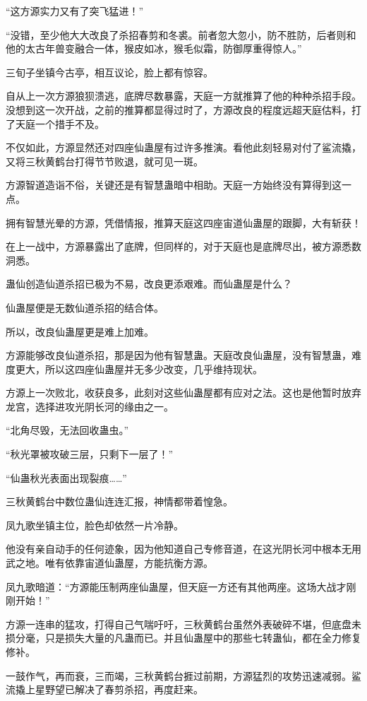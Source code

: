 \begin{this_body}
“这方源实力又有了突飞猛进！”

“没错，至少他大大改良了杀招春剪和冬裘。前者忽大忽小，防不胜防，后者则和他的太古年兽变融合一体，猴皮如冰，猴毛似霜，防御厚重得惊人。”

三旬子坐镇今古亭，相互议论，脸上都有惊容。

自从上一次方源狼狈溃逃，底牌尽数暴露，天庭一方就推算了他的种种杀招手段。没想到这一次开战，之前的推算都显得过时了，方源改良的程度远超天庭估料，打了天庭一个措手不及。

不仅如此，方源显然还对四座仙蛊屋有过许多推演。看他此刻轻易对付了鲨流撬，又将三秋黄鹤台打得节节败退，就可见一斑。

方源智道造诣不俗，关键还是有智慧蛊暗中相助。天庭一方始终没有算得到这一点。

拥有智慧光晕的方源，凭借情报，推算天庭这四座宙道仙蛊屋的跟脚，大有斩获！

在上一战中，方源暴露出了底牌，但同样的，对于天庭也是底牌尽出，被方源悉数洞悉。

蛊仙创造仙道杀招已极为不易，改良更添艰难。而仙蛊屋是什么？

仙蛊屋便是无数仙道杀招的结合体。

所以，改良仙蛊屋更是难上加难。

方源能够改良仙道杀招，那是因为他有智慧蛊。天庭改良仙蛊屋，没有智慧蛊，难度更大，所以这四座仙蛊屋并无多少改变，几乎维持现状。

方源上一次败北，收获良多，此刻对这些仙蛊屋都有应对之法。这也是他暂时放弃龙宫，选择进攻光阴长河的缘由之一。

“北角尽毁，无法回收蛊虫。”

“秋光罩被攻破三层，只剩下一层了！”

“仙蛊秋光表面出现裂痕……”

三秋黄鹤台中数位蛊仙连连汇报，神情都带着惶急。

凤九歌坐镇主位，脸色却依然一片冷静。

他没有亲自动手的任何迹象，因为他知道自己专修音道，在这光阴长河中根本无用武之地。唯有依靠宙道仙蛊屋，方能抗衡方源。

凤九歌暗道：“方源能压制两座仙蛊屋，但天庭一方还有其他两座。这场大战才刚刚开始！”

方源一连串的猛攻，打得自己气喘吁吁，三秋黄鹤台虽然外表破碎不堪，但底盘未损分毫，只是损失大量的凡蛊而已。并且仙蛊屋中的那些七转蛊仙，都在全力修复修补。

一鼓作气，再而衰，三而竭，三秋黄鹤台捱过前期，方源猛烈的攻势迅速减弱。鲨流撬上星野望已解决了春剪杀招，再度赶来。


\end{this_body}
